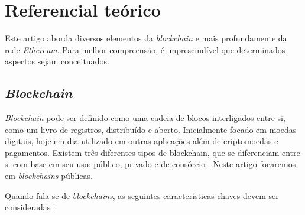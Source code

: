 {\section{\esp Referencial teórico}
Este artigo aborda diversos elementos da \textit{blockchain} e mais profundamente da rede \textit{Ethereum}. Para melhor compreensão, é imprescindível que determinados aspectos sejam conceituados.

\subsection{\esp \textit{Blockchain}} \label{blockchain}
\textit{Blockchain} pode ser definido como uma cadeia de blocos interligados entre si, como um livro de registros, distribuído e aberto. Inicialmente focado em moedas digitais, hoje em dia utilizado em outras aplicações além de criptomoedas e pagamentos. Existem três diferentes tipos de blockchain, que se diferenciam entre si com base em seu uso: público, privado e de consórcio \cite{bhutta2021survey}. Neste artigo focaremos em \textit{blockchains} públicas.

Quando fala-se de \textit{blockchains}, as seguintes características chaves devem ser consideradas \cite{bhutta2021survey}:

}
